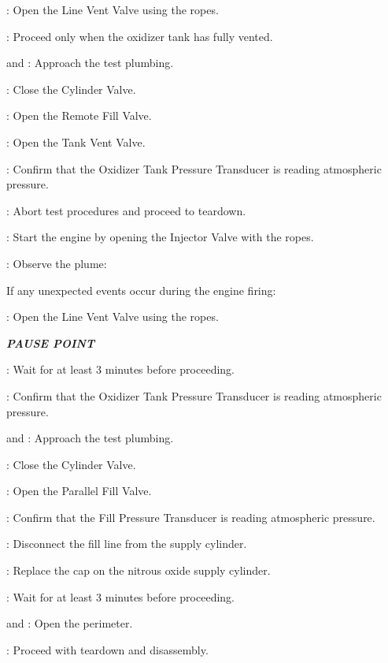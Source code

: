 \begin{checklist}
\begin{checklist}
\begin{checklist}[label=$\bullet$]
\begin{checklist}
                \item \primary: Open the Line Vent Valve using the ropes.
                \item \ops: Proceed only when the oxidizer tank has fully vented.
                \item \primary{} and \secondary: Approach the test plumbing.
                \item \primary{}: Close the Cylinder Valve.
                \item \primary{}: Open the Remote Fill Valve.
                \item \primary{}: Open the Tank Vent Valve.
                \item \daq{}: Confirm that the Oxidizer Tank Pressure Transducer is reading atmospheric pressure.
                \item \ops: Abort test procedures and proceed to teardown.
            \end{checklist}
        \end{checklist}
        \item \primary: Start the engine by opening the Injector Valve with the ropes.
    \end{checklist}
    \item \primary: Observe the plume:
    \begin{checklist}[label=$\bullet$]
        \item If any unexpected events occur during the engine firing:
        \begin{checklist}
            \item \primary{}: Open the Line Vent Valve using the ropes.
        \end{checklist}
    \end{checklist}
    \item \textbf{\textit{PAUSE POINT}}
    \item \ops{}: Wait for at least 3 minutes before proceeding.
    \item \daq{}: Confirm that the Oxidizer Tank Pressure Transducer is reading atmospheric pressure.
    \item \primary{} and \secondary: Approach the test plumbing.
    \item \primary{}: Close the Cylinder Valve.
    \item \primary{}: Open the Parallel Fill Valve.
    \item \daq{}: Confirm that the Fill Pressure Transducer is reading atmospheric pressure.
    \item \primary{}: Disconnect the fill line from the supply cylinder.
    \item \primary{}: Replace the cap on the nitrous oxide supply cylinder.
    \item \ops{}: Wait for at least 3 minutes before proceeding.
    \item \peri{} and \perii{}: Open the perimeter.
    \item \ops{}: Proceed with teardown and disassembly.


\end{checklist}


